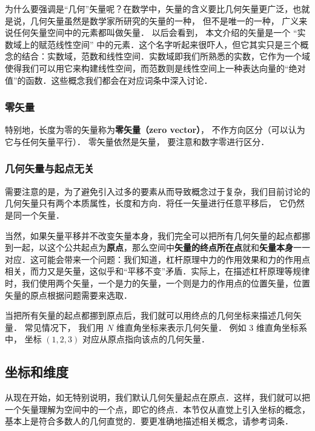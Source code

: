 为什么要强调是“几何”矢量呢？在数学中，矢量的含义要比几何矢量更广泛，也就是说，几何矢量虽然是数学家所研究的矢量的一种， 但不是唯一的一种， 广义来说任何矢量空间中的元素都叫做矢量． 以后会看到， 本文介绍的矢量是一个 “实数域上的赋范线性空间” 中的元素．这个名字听起来很吓人，但它其实只是三个概念的结合：实数域，范数和线性空间．实数域即我们所熟悉的实数，它作为一个域使得我们可以用它来构建线性空间，而范数则是线性空间上一种表达向量的“绝对值”的函数．这些概念我们都会在对应词条中深入讨论．

\subsubsection{零矢量}
特别地，长度为零的矢量称为\textbf{零矢量（zero vector）}， 不作方向区分（可以认为它与任何矢量平行）． 零矢量依然是矢量， 要注意和数字零进行区分．

\subsubsection{几何矢量与起点无关}
需要注意的是，为了避免引入过多的要素从而导致概念过于复杂，我们目前讨论的几何矢量只有两个本质属性，长度和方向．将任一矢量进行任意平移后， 它仍然是同一个矢量．


当然，如果矢量平移并不改变矢量本身，我们完全可以把所有几何矢量的起点都挪到一起，以这个公共起点为\textbf{原点}，那么空间中\textbf{矢量的终点所在点}就和\textbf{矢量本身}一一对应．这可能会带来一个问题：我们知道，杠杆原理中力的作用效果和力的作用点相关，而力又是矢量，这似乎和“平移不变”矛盾．实际上，在描述杠杆原理等规律时，我们使用两个矢量，一个是力的矢量，一个则是力的作用点的位置矢量，位置矢量的原点根据问题需要来选取．

当把所有矢量的起点都挪到原点后，我们就可以用终点的几何坐标来描述几何矢量． 常见情况下， 我们用 $N$ 维直角坐标来表示几何矢量． 例如 3 维直角坐标系中， 坐标 $(1, 2, 3)$ 对应从原点指向该点的几何矢量．

\subsection{坐标和维度}
从现在开始，如无特别说明，我们默认几何矢量起点在原点．这样，我们就可以把一个矢量理解为空间中的一个点，即它的终点．本节仅从直觉上引入坐标的概念，基本上是符合多数人的几何直觉的．要更准确地描述相关概念，请参考词条．

